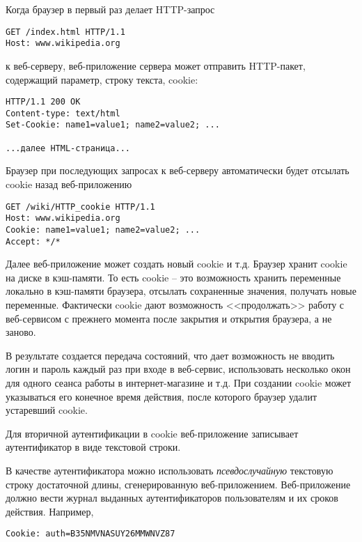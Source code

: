 Когда браузер в первый раз делает HTTP-запрос
\begin{center} \begin{verbatim}
GET /index.html HTTP/1.1
Host: www.wikipedia.org
\end{verbatim} \end{center}
к веб-серверу, веб-приложение сервера может отправить HTTP-пакет, содержащий параметр, строку текста, cookie:
\begin{center} \begin{verbatim}
HTTP/1.1 200 OK
Content-type: text/html
Set-Cookie: name1=value1; name2=value2; ...

...далее HTML-страница...
\end{verbatim} \end{center}
Браузер при последующих запросах к веб-серверу автоматически будет отсылать cookie назад веб-приложению
\begin{center} \begin{verbatim}
GET /wiki/HTTP_cookie HTTP/1.1
Host: www.wikipedia.org
Cookie: name1=value1; name2=value2; ...
Accept: */*
\end{verbatim} \end{center}

Далее веб-приложение может создать новый cookie и т.д. Браузер хранит cookie на диске в кэш-памяти. То есть cookie -- это возможность хранить переменные локально в кэш-памяти браузера, отсылать сохраненные значения, получать новые переменные. Фактически cookie дают возможность <<продолжать>> работу с веб-сервисом с прежнего момента после закрытия и открытия браузера, а не заново.

В результате создается передача состояний, что дает возможность не вводить логин и пароль каждый раз при входе в веб-сервис, использовать несколько окон для одного сеанса работы в интернет-магазине и т.д. При создании cookie может указываться его конечное время действия, после которого браузер удалит устаревший cookie.

Для вторичной аутентификации в cookie веб-приложение записывает аутентификатор в виде текстовой строки.

В качестве аутентификатора можно использовать \emph{псевдослучайную} текстовую строку достаточной длины, сгенерированную веб-приложением. Веб-приложение должно вести журнал выданных аутентификаторов пользователям и их сроков действия. Например,
\begin{center} \begin{verbatim}
Cookie: auth=B35NMVNASUY26MMWNVZ87
\end{verbatim} \end{center}

